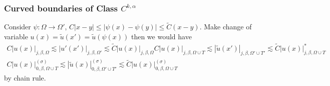 \documentclass[12pt,a4paper]{article}
\begin{document}
\subsubsection*{Curved boundaries of Class $C^{k, \alpha}$}

Consider $\psi : \Omega \rightarrow \Omega'$, $C |x-y| \leq |\psi(x) - \psi(y)| \leq \tilde{C}(x-y)$. Make change of variable $u(x) = \tilde{u}(x')= \tilde{u}(\psi(x))$ then we would have
\begin{align*}
C |u(x)|_{j, \beta, \Omega} \lesssim |u'(x')|_{j, \beta, \Omega'}\lesssim \tilde{C} |u(x)|_{j, \beta, \Omega}
C |u(x)|_{j, \beta, \Omega\cup T} \lesssim |\tilde{u}(x')|_{j, \beta, \Omega'\cup T'} \lesssim \tilde{C} |u(x)|^*_{j, \beta, \Omega\cup T} \\
C |u(x)|^{(\sigma)}_{0, \beta, \Omega\cup T} \lesssim |\tilde{u}(x)|^{(\sigma)}_{0, \beta, \Omega'\cup T'} \lesssim \tilde{C} |u(x)|^{(\sigma)}_{0, \beta, \Omega \cup T}
\end{align*}
by chain rule.
\s
\end{document}
